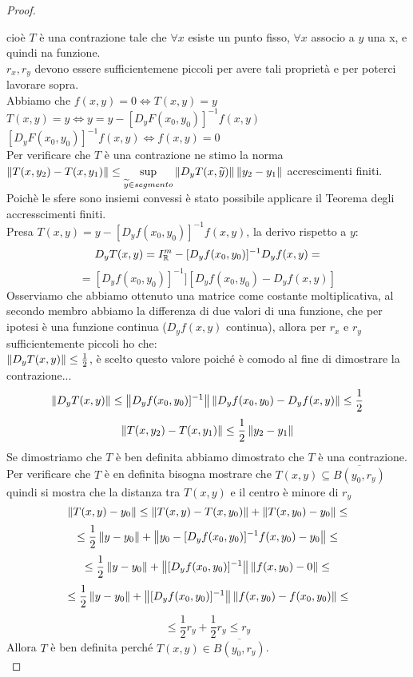 \begin{theorem}
\begin{proof}
\begin{enumerate}
		\end{enumerate}
		cioè $T$ è una contrazione tale che $\forall x$ esiste un punto fisso, $\forall x$ associo a $y$ una x, e quindi na funzione.\\
		$r_x,r_y$ devono essere sufficientemene piccoli per avere tali proprietà e per poterci lavorare sopra.\\
		Abbiamo che $f(x,y)=0 \iff T(x,y)=y$\\
		$T(x,y)=y\iff y=y-[D_yF(x_0,y_0)]^{-1}f(x,y)$\\
		$[D_yF(x_0,y_0)]^{-1}f(x,y)\iff f(x,y)=0$\\
		Per verificare che $T$ è una contrazione ne stimo la norma\\
		$\left\|T(x,y_2)-T(x,y_1)\right\| \le \sup\limits_{\widetilde{y}\in segmento}\left\|D_yT(x,\widetilde{y})\right\|\left\|y_2-y_1\right\| $  accrescimenti finiti.\\
		Poichè le sfere sono insiemi convessi è stato possibile applicare il Teorema degli accresscimenti finiti.\\
		Presa $T(x,y) = y-[D_yf(x_0,y_0)]^{-1}f(x,y)$, la derivo rispetto a $y$:
		$$D_yT(x,y)= I_{\mathbb{R}}^m-[D_yf(x_0,y_0)]^{-1}D_yf(x,y) = $$
		$$=[D_yf(x_0,y_0)]^{-1}][D_yf(x_0,y_0)-D_yf(x,y)]$$
		Osserviamo che abbiamo ottenuto una matrice come costante moltiplicativa, al secondo membro abbiamo la differenza di due valori di una funzione, che per ipotesi è una funzione continua ($D_yf(x,y)$ continua), allora per $r_x$ e $r_y$ sufficientemente piccoli ho che:\\
		$\left\|D_yT(x,y)\right\| \le \frac{1}{2}$, è scelto questo valore poiché è comodo al fine di dimostrare la contrazione...\\
		$$\left\|D_yT(x,y)\right\| \le \left\|D_yf(x_0,y_0)]^{-1}\right\| \left\|D_yf(x_0,y_0)-D_yf(x,y)\right\|\le\frac{1}{2} $$  
		$$\left\|T(x,y_2)-T(x,y_1)\right\|\le\frac{1}{2}\left\|y_2-y_1\right\| $$
		Se dimostriamo che $T$ è ben definita abbiamo dimostrato che $T$ è una contrazione.\\
		Per verificare che $T$ è en definita bisogna mostrare che $T(x,y)\subseteq\overline{B(y_0,r_y)}$ quindi si mostra che la distanza tra $T(x,y)$ e il centro è minore di $r_y$
		$$\left\|T(x,y) - y_0\right\|\le\left\|T(x,y)-T(x,y_0)\right\|+\left\|T(x,y_0)-y_0\right\| \le$$
		$$\le\frac{1}{2}\left\|y-y_0\right\|+\left\|y_0-[D_yf(x_0,y_0)]^{-1}f(x,y_0)-y_0\right\|\le$$
		$$\le\frac{1}{2}\left\|y-y_0\right\|+\left\|[D_yf(x_0,y_0)]^{-1}\right\| \left\|f(x,y_0)-0\right\|\le$$
		$$\le\frac{1}{2}\left\|y-y_0\right\|+\left\|[D_yf(x_0,y_0)]^{-1}\right\| \left\|f(x,y_0)-f(x_0,y_0)\right\|\le$$
		$$\le\frac{1}{2}r_y+\frac{1}{2}r_y\le r_y$$
		Allora $T$ è ben definita perché $T(x,y)\in\overline{B(y_0,r_y)}$.\\

\end{proof}
\end{theorem}
